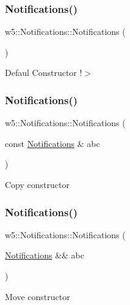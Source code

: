 \subsubsection{\texorpdfstring{Notifications()}{Notifications()}\hspace{0.1cm}{\footnotesize\ttfamily [1/3]}}
{\footnotesize\ttfamily w5\+::\+Notifications\+::\+Notifications (\begin{DoxyParamCaption}{ }\end{DoxyParamCaption})}

Defaul Constructor !$>$ \mbox{\label{classw5_1_1_notifications_a61b8d9e26f969e42537a22194dae4078}} 
\subsubsection{\texorpdfstring{Notifications()}{Notifications()}\hspace{0.1cm}{\footnotesize\ttfamily [2/3]}}
{\footnotesize\ttfamily w5\+::\+Notifications\+::\+Notifications (\begin{DoxyParamCaption}\item[{const \mbox{\hyperlink{classw5_1_1_notifications}{Notifications}} \&}]{abc }\end{DoxyParamCaption})}

Copy constructor \mbox{\label{classw5_1_1_notifications_a123a389920ea6c6d60840577b9663c25}} 
\subsubsection{\texorpdfstring{Notifications()}{Notifications()}\hspace{0.1cm}{\footnotesize\ttfamily [3/3]}}
{\footnotesize\ttfamily w5\+::\+Notifications\+::\+Notifications (\begin{DoxyParamCaption}\item[{\mbox{\hyperlink{classw5_1_1_notifications}{Notifications}} \&\&}]{abc }\end{DoxyParamCaption})}

Move constructor \mbox{\label{classw5_1_1_notifications_a657e031fdb6442a8aacb968ce351c569}} 
